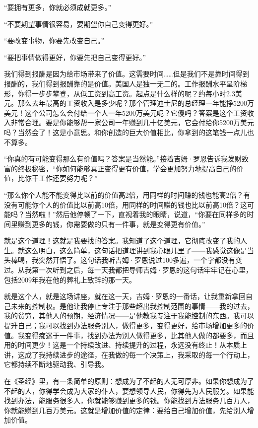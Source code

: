 “要拥有更多，你就必须成就更多。”

“不要期望事情很容易，要期望你自己变得更好。”

“要改变事物，你要先改变自己。”

“要把事情做得更好，你要先把自己变得更好。”

我们得到报酬是因为给市场带来了价值。这需要时间……但是我们不是靠时间得到报酬的，我们得到报酬靠的是价值。美国人是独一无二的。工作报酬水平呈阶梯形，你得一步步攀登，从低工资到高工资。起点是什么样的呢？约每小时2.3美元。那么去年最高的工资收入是多少呢？那个管理迪士尼的总经理一年能挣5200万美元！这个公司怎么会付给一个人一年5200万美元呢？它傻吗？答案是这个工资收入非常合理。要是你能够帮一家公司一年赚到几十亿美元，它会付给你5200万美元吗？当然会了！这是小意思。和你创造的巨大价值相比，你拿到的这笔钱一点儿也不算多。

“你真的有可能变得那么有价值吗？答案是当然能。”接着吉姆·罗恩告诉我发财致富的终极秘密，“你如何能够真正变得更有价值，学会更加努力地提高自己的价值，比你干工作还要努力呢？”

“那么你个人能不能变得比以前的价值高2倍，用同样的时间赚的钱也能高2倍？有没有可能你个人的价值比以前高10倍，用同样的时间赚的钱也比以前高10倍？这可能吗？当然啦！”然后他停顿了一下，直视着我的眼睛，说道，“你要在同样多的时间里赚到更多的钱，你需要做的只有一件事，就是变得更有价值。”

就是这个道理！这就是我要找的答案。我知道了这个道理，它彻底改变了我的人生。就这么明白，这么简单，这句话把道理讲到我心眼儿里了——我感觉这像是当头棒喝，我突然开悟了。这句话我听吉姆·罗恩说过100多遍，一个字都没有变过。从我第一次听到之后，每一天我都把导师吉姆·罗恩的这句话牢牢记在心里，包括2009年我在他的葬礼上致辞的那一天。

就是这个人，就是这场讲座，就在这一天，吉姆·罗恩的一番话，让我重新拿回自己未来的控制权。是他让我停止专注于那些超出我控制范围的事情——我的过去，我的贫穷，其他人的预期，经济情况——是他教我专注于我能控制的东西。我可以提升自己；我可以找到办法服务别人，做得更多，变得更好，给市场增加更多的价值。我变得痴迷于一件事，找到办法为别人做得更多，比其他人做的都要多，而且用的时间更少！这是一个持续改进、持续提升的过程，永远没有终止！从本质上讲，这成了我持续进步的途径，在我做的每一个决策上，我采取的每一个行动上，它都持续不断地驱动我、引导我。

在《圣经》里，有一条简单的原则：想成为了不起的人无可厚非。如果你想成为了不起的人，你得学会成为大家的仆人，要想领导人民，你得先为人民服务。如果能找到办法，能服务很多人，你就能够赚到更多的钱。你能找到方法服务几百万人，你就能赚到几百万美元。这就是增加价值的定律：要给自己增加价值，先给别人增加价值。

